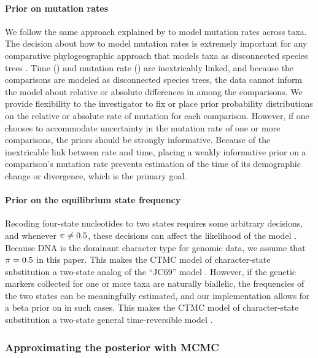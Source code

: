 \paragraph{Prior on mutation rates}
We follow the same approach explained by \citet{Oaks2018ecoevolity} to model
mutation rates across taxa.
The decision about how to model mutation rates is extremely important for any
comparative phylogeographic approach that models taxa as disconnected
species trees
\citep[\fig{}~\ref{fig:modelCartoon}; e.g.,][]{Hickerson2006,Hickerson2007,Huang2011,Chan2014,Oaks2014dpp,Xue2015,Burbrink2016,Xue2017,Gehara2017,Oaks2018ecoevolity}.
Time (\etime) and mutation rate (\murate) are inextricably linked, and because
the comparisons are modeled as disconnected species trees, the data cannot
inform the model about relative or absolute differences in \murate among the
comparisons.
We provide flexibility to the investigator to fix or place prior probability
distributions on the relative or absolute rate of mutation for each comparison.
However, if one chooses to accommodate uncertainty in the mutation rate of one
or more comparisons, the priors should be strongly informative.
Because of the inextricable link between rate and time,
placing a weakly informative prior on a comparison's mutation rate prevents
estimation of the time of its demographic change or divergence,
which is the primary goal.

\paragraph{Prior on the equilibrium state frequency}
Recoding four-state nucleotides to two states requires some arbitrary
decisions, and whenever $\pi_{} \neq 0.5$, these decisions can affect
the likelihood of the model \citep{Oaks2018ecoevolity}.
Because DNA is the dominant character type for genomic data, we assume that
$\pi_{} = 0.5$ in this paper.
This makes the CTMC model of character-state substitution a two-state analog of
the ``JC69'' model \citep{JC1969}.
However, if the genetic markers collected for one or more taxa are naturally
biallelic, the frequencies of the two states can be meaningfully estimated, and
our implementation allows for a beta prior on \gfreq in such cases.
This makes the CTMC model of character-state substitution a two-state general
time-reversible model \citep{Tavare1986}.

\subsubsection{Approximating the posterior with MCMC}

